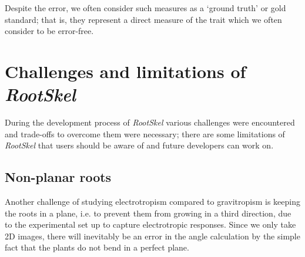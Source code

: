 Despite the error, we often consider such measures as a ‘ground truth’ or gold standard; that is, they represent a direct measure of the trait which we often consider to be error-free. 




\section{Challenges and limitations of \textit{RootSkel}}

During the development process of \textit{RootSkel} various challenges were encountered and trade-offs to overcome them were necessary; there are some limitations of \textit{RootSkel} that users should be aware of and future developers can work on.


\subsection{Non-planar roots}

Another challenge of studying electrotropism compared to gravitropism %
is keeping the roots in a plane, i.e. to prevent them from growing in a third direction, due to the experimental set up to capture electrotropic responses. Since we only take 2D images, there will inevitably be an error in the angle calculation by the simple fact that the plants do not bend in a perfect plane.

